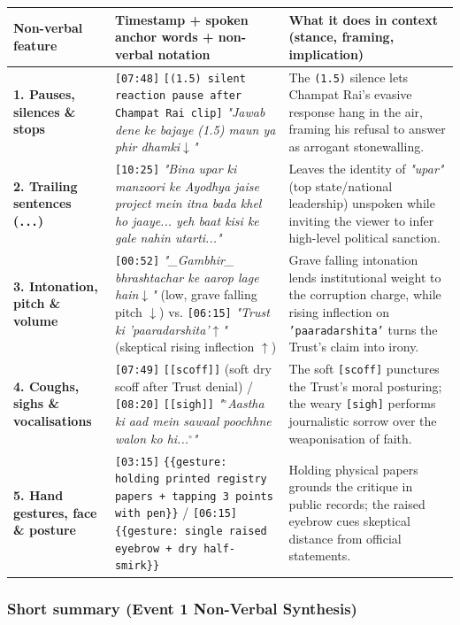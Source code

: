 \documentclass[10pt,a4paper]{article}
\begin{document}
\begin{longtable}{|p{}|p{}|p{}|}
\hline
Non-verbal feature & Timestamp + spoken anchor words + non-verbal notation & What it does in context (stance, framing, implication) \\ \hline \endhead
\textbf{1. Pauses, silences \& stops} & \texttt{[07:48]} \texttt{[(1.5) silent reaction pause after Champat Rai clip]} \textit{"Jawab dene ke bajaye (1.5) maun ya phir dhamki$\downarrow$"} & The \texttt{(1.5)} silence lets Champat Rai's evasive response hang in the air, framing his refusal to answer as arrogant stonewalling. \\ \hline
\textbf{2. Trailing sentences (\texttt{...})} & \texttt{[10:25]} \textit{"Bina upar ki manzoori ke Ayodhya jaise project mein itna bada khel ho jaaye... yeh baat kisi ke gale nahin utarti..."} & Leaves the identity of \textit{"upar"} (top state/national leadership) unspoken while inviting the viewer to infer high-level political sanction. \\ \hline
\textbf{3. Intonation, pitch \& volume} & \texttt{[00:52]} \textit{"\_Gambhir\_ bhrashtachar ke aarop lage hain$\downarrow$"} (low, grave falling pitch \texttt{$\downarrow$}) vs. \texttt{[06:15]} \textit{"Trust ki 'paaradarshita'$\uparrow$"} (skeptical rising inflection \texttt{$\uparrow$}) & Grave falling intonation lends institutional weight to the corruption charge, while rising inflection on \texttt{'paaradarshita'} turns the Trust's claim into irony. \\ \hline
\textbf{4. Coughs, sighs \& vocalisations} & \texttt{[07:49]} \texttt{[[scoff]]} (soft dry scoff after Trust denial) / \texttt{[08:20]} \texttt{[[sigh]]} \textit{"$^\circ$Aastha ki aad mein sawaal poochhne walon ko hi...$^\circ$"} & The soft \texttt{[scoff]} punctures the Trust's moral posturing; the weary \texttt{[sigh]} performs journalistic sorrow over the weaponisation of faith. \\ \hline
\textbf{5. Hand gestures, face \& posture} & \texttt{[03:15]} \texttt{\{\{gesture: holding printed registry papers + tapping 3 points with pen\}\}} / \texttt{[06:15]} \texttt{\{\{gesture: single raised eyebrow + dry half-smirk\}\}} & Holding physical papers grounds the critique in public records; the raised eyebrow cues skeptical distance from official statements. \\ \hline
\end{longtable}

\subsubsection*{Short summary (Event 1 Non-Verbal Synthesis)}
\end{document}
